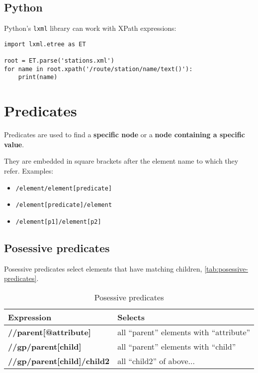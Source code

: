 \documentclass[slides]{pgnotes}
\begin{document}
\subsection{Python}

Python's \texttt{lxml} library can work with XPath expressions:
\begin{verbatim}
import lxml.etree as ET

root = ET.parse('stations.xml')
for name in root.xpath('/route/station/name/text()'):
    print(name)
\end{verbatim}



\section{Predicates}

Predicates are used to find a \textbf{specific node} or a \textbf{node containing a specific value}.

They are embedded in square brackets after the element name to which they refer.
Examples:
\begin{itemize}
\item \texttt{/element/element[predicate]}
\item \texttt{/element[predicate]/element}
\item \texttt{/element[p1]/element[p2]}
\end{itemize}


\subsection{Posessive predicates}

Posessive predicates select elements that have matching children, \autoref{tab:posessive-predicates}. 

\begin{table}[htbp]
  \centering
  \begin{tabularx}{1.0\linewidth}{l X}
    \toprule
    \textbf{Expression} & \textbf{Selects} \\
    \midrule
    \textbf{//parent[@attribute]} &  all ``parent'' elements with  ``attribute'' \\
    \textbf{//gp/parent[child]} & all ``parent'' elements with ``child'' \\
    \textbf{//gp/parent[child]/child2} &  all ``child2'' of above... \\
    \bottomrule
  \end{tabularx}
  \caption{Posessive predicates}
  \label{tab:posessive-predicates}
\end{table}
\end{document}
